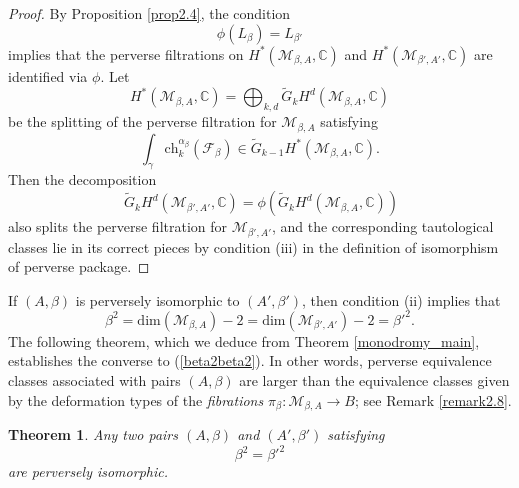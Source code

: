 \documentclass[11pt]{amsart}
\theoremstyle{plain}
\newtheorem{thm}{Theorem}[section]
\theoremstyle{definition}
\theoremstyle{remark}
\newcommand{\BC}{{\mathbb{C}}}
\newcommand{\CF}{{\mathcal F}}
\newcommand{\CM}{{\mathcal M}}
\begin{document}
\begin{proof}
By Proposition \ref{prop2.4}, the condition 
\[
\phi(L_\beta) = L_{\beta'}
\]
implies that the perverse filtrations on $H^*(\CM_{\beta,A}, \BC)$ and $H^*(\CM_{\beta', A'}, \BC)$ are identified via $\phi$. Let 
\[
H^*(\CM_{\beta,A}, \BC) = \bigoplus_{k,d} \widetilde{G}_k H^d(\CM_{\beta,A}, \BC)
\]
be the splitting of the perverse filtration for $\CM_{\beta, A}$ satisfying
\[
\int_\gamma \mathrm{ch}^{\alpha_\beta}_k(\CF_\beta) \in \widetilde{G}_{k-1}H^*(\CM_{\beta,A}, \BC).
\] 
Then the decomposition 
\[
\
\widetilde{G}_k H^d(\CM_{\beta',A'}, \BC) = \phi(\widetilde{G}_k H^d(\CM_{\beta,A}, \BC))
\]
also splits the perverse filtration for $\CM_{\beta',A'}$, and the corresponding tautological classes lie in its correct pieces by  condition (iii) in the definition of isomorphism of perverse package.
\end{proof}

If $(A, \beta)$ is perversely isomorphic to $(A', \beta')$, then condition (ii) implies that
\begin{equation}\label{beta2beta2}
\beta^2 = \mathrm{dim}(\CM_{\beta,A}) -2 = \mathrm{dim}(\CM_{\beta',A'}) -2 = \beta'^2.
\end{equation}
The following theorem, which we  deduce from Theorem \ref{monodromy_main}, establishes the  converse
to (\ref{beta2beta2}). In other words, perverse equivalence classes associated with pairs $(A, \beta)$ are larger than the equivalence classes
given  by the deformation types of the \emph{fibrations} $\pi_\beta: \CM_{\beta,A} \to B$; see Remark \ref{remark2.8}.


\begin{thm}\label{thm2.6}
Any two pairs $(A, \beta)$ and $(A', \beta')$ satisfying
\[
\beta^2 = \beta'^2 
\]
are perversely isomorphic.
\end{thm}
\end{document}
